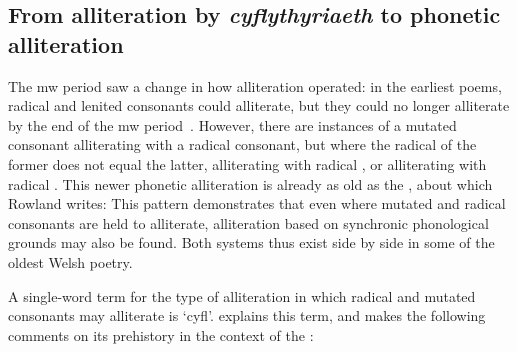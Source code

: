 \subsection{From alliteration by \textit{cyflythyriaeth} to phonetic alliteration}
The \gls{mw} period saw a change in how alliteration operated: in the earliest poems, radical and lenited consonants could alliterate, but they could no longer alliterate by the end of the \gls{mw} period~\parencite[339]{rowland_early_1990}. However, there are instances of a mutated consonant alliterating with a radical consonant, but where the radical of the former does not equal the latter, \eg {} alliterating with radical , or  alliterating with radical . This newer phonetic alliteration is already as old as the , about which Rowland writes: 
This pattern demonstrates that even where mutated and radical consonants are held to alliterate, alliteration based on synchronic phonological grounds may also be found. Both systems thus exist side by side in some of the oldest Welsh poetry. 

A single-word term for the type of alliteration in which radical and mutated consonants may alliterate is `\gls{cyfl}'. \Textcite{koch_gododdin_1997} explains this term, and makes the following comments on its prehistory in the context of the :

